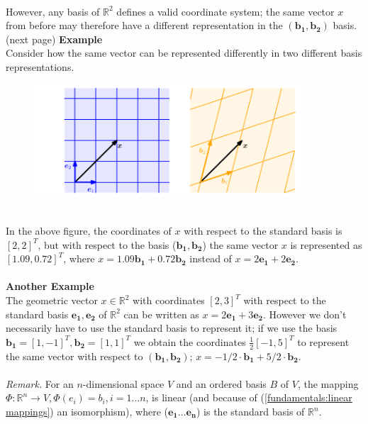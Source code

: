\documentclass{report}
\begin{document}
\vspace{1mm}\\
However, any basis of $\mathbb{R}^2$ defines a valid coordinate system; the same vector $x$ from before 
may therefore have a different representation in the 
$\bm{(b_1,b_2)}$ basis.\\
(next page)
\newpage
\noindent\textbf{Example}\\
Consider how the same vector can be represented differently in two different basis representations.
\begin{figure}[h]
\includegraphics[width=10cm]{1}\\
\centering
\end{figure}\\
In the above figure, the coordinates of $x$ with respect to the standard basis is $[2,2]^T$,
but with respect to the basis ($\bm{b_1,b_2}$) the same vector $x$ is represented as $[1.09,0.72]^T$, 
where $x=1.09\bm{b_1}+0.72\bm{b_2}$ instead of $x=2\bm{e_1}+2\bm{e_2}$.\\
\vspace{1mm}\\
\textbf{Another Example}\\
The geometric vector $x\in\mathbb{R}^2$ with coordinates
$[2,3]^T$ with respect to the standard basis $\bm{e_1,e_2}$ of $\mathbb{R}^2$ can be written as 
$x=2\bm{e_1}+3\bm{e_2}$. However we don't necessarily have to use the standard basis to represent it;
if we use the basis $\bm{b_1}=[1,-1]^T,\bm{b_2}=[1,1]^T$ we obtain the coordinates $\frac{1}{2}[-1,5]^T$
to represent the same vector with respect to $(\bm{b_1,b_2})$; $x=-1/2\cdot\bm{b_1}+5/2\cdot\bm{b_2}$.\\
\vspace{1mm}\\
\textit{Remark.} For an $n$-dimensional space $V$ and an ordered basis $B$ of $V$, the mapping
$\Phi:\mathbb{R}^n\rightarrow V,\Phi(e_i)=b_i,i=1\ldots n$, is linear 
(and because of (\ref{fundamentals:linear mappings}) an isomorphism), where ($\bm{e_1\ldots e_n}$) 
is the standard basis of $\mathbb{R}^n$.\\
\end{document}

